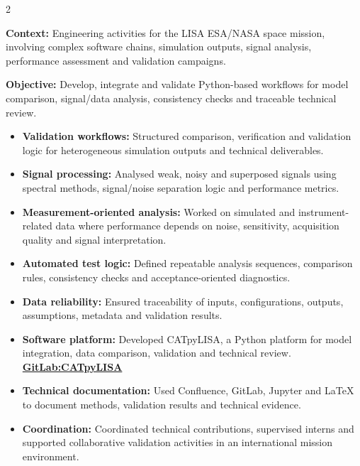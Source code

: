 \documentclass[8pt,a4paper,ragged2e,withhyper]{altacv}
\begin{document}
\begin{paracol}{2}
\divider


\textbf{Context:} Engineering activities for the LISA ESA/NASA space mission, involving complex software chains, simulation outputs, signal analysis, performance assessment and validation campaigns.

\textbf{Objective:} Develop, integrate and validate Python-based workflows for model comparison, signal/data analysis, consistency checks and traceable technical review.

\begin{itemize}
  \item \textbf{Validation workflows:} Structured comparison, verification and validation logic for heterogeneous simulation outputs and technical deliverables.
  \item \textbf{Signal processing:} Analysed weak, noisy and superposed signals using spectral methods, signal/noise separation logic and performance metrics.
  \item \textbf{Measurement-oriented analysis:} Worked on simulated and instrument-related data where performance depends on noise, sensitivity, acquisition quality and signal interpretation.
  \item \textbf{Automated test logic:} Defined repeatable analysis sequences, comparison rules, consistency checks and acceptance-oriented diagnostics.
  \item \textbf{Data reliability:} Ensured traceability of inputs, configurations, outputs, assumptions, metadata and validation results.
  \item \textbf{Software platform:} Developed CATpyLISA, a Python platform for model integration, data comparison, validation and technical review.
  \textcolor{DarkPastelRed}{\href{https://gitlab.oca.eu/gboileau/lisa_l3_tools}{\bf GitLab:CATpyLISA}}
  \item \textbf{Technical documentation:} Used Confluence, GitLab, Jupyter and LaTeX to document methods, validation results and technical evidence.
  \item \textbf{Coordination:} Coordinated technical contributions, supervised interns and supported collaborative validation activities in an international mission environment.
\end{itemize}

\divider


\end{paracol}
\end{document}
